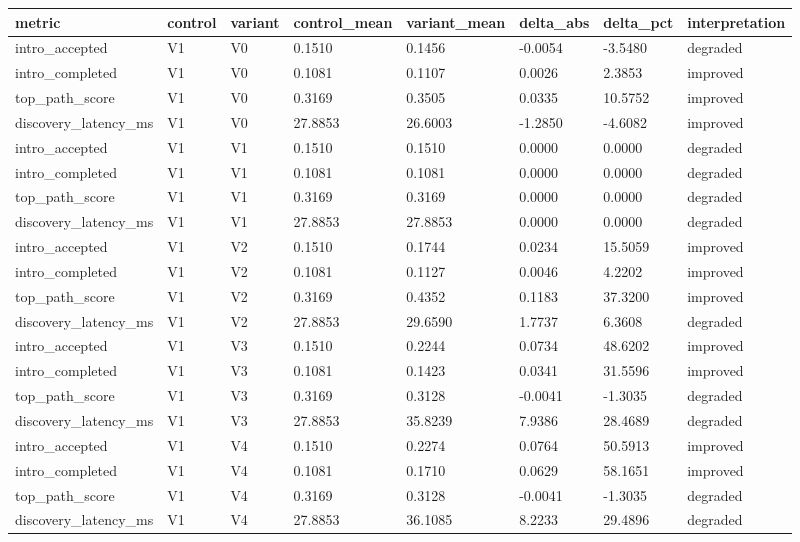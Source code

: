 \begin{tabular}{llllllll}
\toprule
metric & control & variant & control_mean & variant_mean & delta_abs & delta_pct & interpretation \\
\midrule
intro_accepted & V1 & V0 & 0.1510 & 0.1456 & -0.0054 & -3.5480 & degraded \\
intro_completed & V1 & V0 & 0.1081 & 0.1107 & 0.0026 & 2.3853 & improved \\
top_path_score & V1 & V0 & 0.3169 & 0.3505 & 0.0335 & 10.5752 & improved \\
discovery_latency_ms & V1 & V0 & 27.8853 & 26.6003 & -1.2850 & -4.6082 & improved \\
intro_accepted & V1 & V1 & 0.1510 & 0.1510 & 0.0000 & 0.0000 & degraded \\
intro_completed & V1 & V1 & 0.1081 & 0.1081 & 0.0000 & 0.0000 & degraded \\
top_path_score & V1 & V1 & 0.3169 & 0.3169 & 0.0000 & 0.0000 & degraded \\
discovery_latency_ms & V1 & V1 & 27.8853 & 27.8853 & 0.0000 & 0.0000 & degraded \\
intro_accepted & V1 & V2 & 0.1510 & 0.1744 & 0.0234 & 15.5059 & improved \\
intro_completed & V1 & V2 & 0.1081 & 0.1127 & 0.0046 & 4.2202 & improved \\
top_path_score & V1 & V2 & 0.3169 & 0.4352 & 0.1183 & 37.3200 & improved \\
discovery_latency_ms & V1 & V2 & 27.8853 & 29.6590 & 1.7737 & 6.3608 & degraded \\
intro_accepted & V1 & V3 & 0.1510 & 0.2244 & 0.0734 & 48.6202 & improved \\
intro_completed & V1 & V3 & 0.1081 & 0.1423 & 0.0341 & 31.5596 & improved \\
top_path_score & V1 & V3 & 0.3169 & 0.3128 & -0.0041 & -1.3035 & degraded \\
discovery_latency_ms & V1 & V3 & 27.8853 & 35.8239 & 7.9386 & 28.4689 & degraded \\
intro_accepted & V1 & V4 & 0.1510 & 0.2274 & 0.0764 & 50.5913 & improved \\
intro_completed & V1 & V4 & 0.1081 & 0.1710 & 0.0629 & 58.1651 & improved \\
top_path_score & V1 & V4 & 0.3169 & 0.3128 & -0.0041 & -1.3035 & degraded \\
discovery_latency_ms & V1 & V4 & 27.8853 & 36.1085 & 8.2233 & 29.4896 & degraded \\
\bottomrule
\end{tabular}
